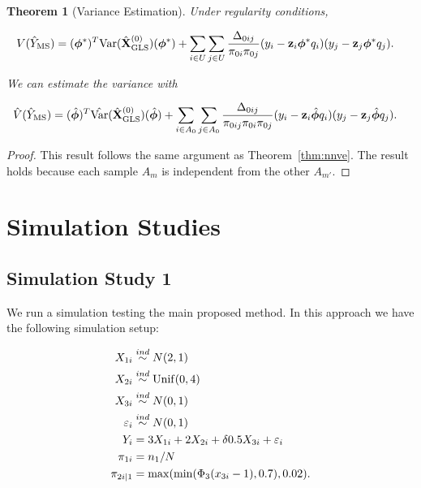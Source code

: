 \documentclass[12pt]{article}
\newtheorem{theorem}{Theorem}
\newcommand{\Var}{{\text{Var}}}
\renewcommand{\bf}[1]{\mathbf{#1}}
\begin{document}
\begin{theorem}[Variance Estimation]
  Under regularity conditions,

  $$
  \begin{aligned}
    V(\hat Y_{\rm MS}) 
    &= (\bm \phi^{*})^T\Var(\hat{\bf X}_{\rm GLS}^{(0)}) (\bm \phi^{*}) + 
      \sum_{i \in U} \sum_{j \in U} \frac{\Delta_{0ij}}{\pi_{0i}\pi_{0j}}
      (y_i - \bf z_i\bm \phi^{*}q_i)
      (y_j - \bf z_j\bm \phi^{*}q_j). 
  \end{aligned}
  $$

  We can estimate the variance with

  $$
  \begin{aligned}
    \hat V(\hat Y_{\rm MS}) 
    &= (\hat{\bm \phi})^T \hat \Var(\hat{\bf X}_{\rm GLS}^{(0)}) (\hat{\bm \phi})
    + \sum_{i \in A_0} \sum_{j \in A_0} \frac{\Delta_{0ij}}{\pi_{0ij}\pi_{0i}\pi_{0j}}
      (y_i - \bf z_i \hat{\bm \phi}q_i)
      (y_j - \bf z_j \hat{\bm \phi}q_j). 
  \end{aligned}
  $$

\end{theorem}

\begin{proof}
  This result follows the same argument as Theorem~\eqref{thm:nnve}. The result
  holds because each sample $A_m$ is independent from the other $A_{m'}$.
\end{proof}

\section{Simulation Studies}

\subsection{Simulation Study 1}

We run a simulation testing the main proposed method. In this approach we have the
following simulation setup:

$$
\begin{aligned}
X_{1i} &\stackrel{ind}{\sim} N(2, 1) \\
X_{2i} &\stackrel{ind}{\sim} \rm{Unif}(0, 4) \\
X_{3i} &\stackrel{ind}{\sim} N(0, 1) \\
\varepsilon_i &\stackrel{ind}{\sim} N(0, 1) \\
Y_{i} &= 3 X_{1i} + 2 X_{2i} + \delta 0.5 X_{3i} + \varepsilon_i \\
\pi_{1i} &= n_1 / N \\
\pi_{2i|1} &= \max(\min(\Phi_3(x_{3i} - 1), 0.7), 0.02).
\end{aligned}
$$
\end{document}

